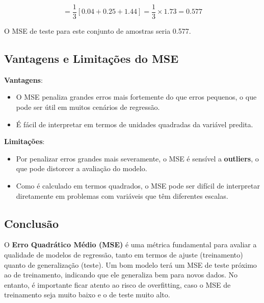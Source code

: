\documentclass{sciposter}
\begin{document}
\begin{multicols}{3}
\[
= \frac{1}{3} \left[ 0.04 + 0.25 + 1.44 \right] = \frac{1}{3} \times 1.73 = 0.577
\]

O MSE de teste para este conjunto de amostras seria 0.577.

\subsection{Vantagens e Limitações do MSE}

\textbf{Vantagens}:
\begin{itemize}
    \item O MSE penaliza grandes erros mais fortemente do que erros pequenos, o que pode ser útil em muitos cenários de regressão.
    \item É fácil de interpretar em termos de unidades quadradas da variável predita.
\end{itemize}

\textbf{Limitações}:
\begin{itemize}
    \item Por penalizar erros grandes mais severamente, o MSE é sensível a \textbf{outliers}, o que pode distorcer a avaliação do modelo.
    \item Como é calculado em termos quadrados, o MSE pode ser difícil de interpretar diretamente em problemas com variáveis que têm diferentes escalas.
\end{itemize}

\subsection{Conclusão}

O \textbf{Erro Quadrático Médio (MSE)} é uma métrica fundamental para avaliar a qualidade de modelos de regressão, tanto em termos de ajuste (treinamento) quanto de generalização (teste). Um bom modelo terá um MSE de teste próximo ao de treinamento, indicando que ele generaliza bem para novos dados. No entanto, é importante ficar atento ao risco de overfitting, caso o MSE de treinamento seja muito baixo e o de teste muito alto.


\end{multicols}
\end{document}
